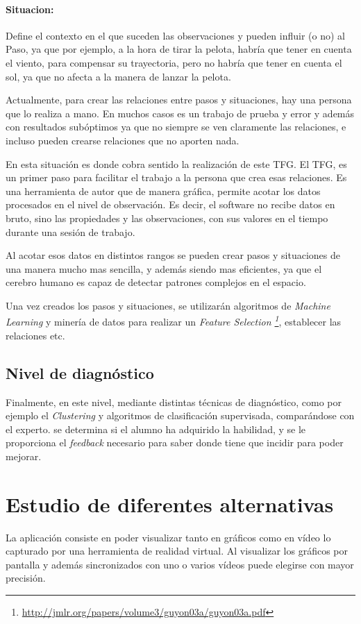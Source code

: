 \paragraph{\textbf{Situacion:}}
Define el contexto en el que suceden las observaciones y pueden influir (o no) al Paso, ya que por ejemplo, a la hora
de tirar la pelota, habr\'ia que tener en cuenta el viento, para compensar su trayectoria, pero no habr\'ia que tener
en cuenta el sol, ya que no afecta a la manera de lanzar la pelota.

Actualmente, para crear las relaciones entre pasos y situaciones, hay una persona que lo realiza a mano. En muchos casos
es un trabajo de prueba y error y adem\'as con resultados sub\'optimos ya que no siempre se ven claramente las relaciones,
e incluso pueden crearse relaciones que no aporten nada.

En esta situaci\'on es donde cobra sentido la realizaci\'on de este TFG. El TFG, es un primer paso para facilitar
el trabajo a la persona que crea esas relaciones. Es una herramienta de autor que de manera gr\'afica, permite
acotar los datos procesados en el nivel de observaci\'on. Es decir, el software no recibe datos en bruto, sino
las propiedades y las observaciones, con sus valores en el tiempo durante una sesi\'on de trabajo.

Al acotar esos datos en distintos rangos se pueden crear pasos y situaciones de una manera mucho mas sencilla, y adem\'as
siendo mas eficientes, ya que el cerebro humano es capaz de detectar patrones complejos en el espacio.

Una vez creados los pasos y situaciones, se utilizar\'an algoritmos de \emph{Machine Learning} y miner\'ia de datos para
realizar un \emph{Feature Selection \footnote{\url{http://jmlr.org/papers/volume3/guyon03a/guyon03a.pdf}}},
establecer las relaciones etc.

\subsection{Nivel de diagn\'ostico}
Finalmente, en este nivel, mediante distintas t\'ecnicas de diagn\'ostico, como por ejemplo el \emph{Clustering} y
algoritmos de clasificaci\'on supervisada, compar\'andose con el experto.
se determina si el alumno ha adquirido la habilidad, y se le proporciona el \emph{feedback} 
necesario para saber donde tiene que incidir para poder mejorar.

\section{Estudio de diferentes alternativas}
La aplicaci\'on consiste en poder visualizar tanto en gr\'aficos como en v\'ideo lo capturado por una herramienta
de realidad virtual. Al visualizar los gr\'aficos por pantalla y adem\'as sincronizados con uno o varios v\'ideos 
puede elegirse con mayor precisi\'on.

